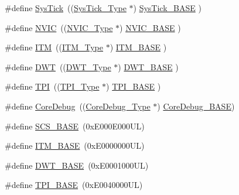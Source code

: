 \begin{DoxyCompactItemize}
\item 
\#define \hyperlink{group___c_m_s_i_s__core__base_gacd96c53beeaff8f603fcda425eb295de}{Sys\+Tick}~((\hyperlink{struct_sys_tick___type}{Sys\+Tick\+\_\+\+Type}   $\ast$)     \hyperlink{group___c_m_s_i_s__core__base_ga58effaac0b93006b756d33209e814646}{Sys\+Tick\+\_\+\+B\+A\+SE}  )
\item 
\#define \hyperlink{group___c_m_s_i_s__core__base_gac8e97e8ce56ae9f57da1363a937f8a17}{N\+V\+IC}~((\hyperlink{struct_n_v_i_c___type}{N\+V\+I\+C\+\_\+\+Type}      $\ast$)     \hyperlink{group___c_m_s_i_s__core__base_gaa0288691785a5f868238e0468b39523d}{N\+V\+I\+C\+\_\+\+B\+A\+SE}     )
\item 
\#define \hyperlink{group___c_m_s_i_s__core__base_gabae7cdf882def602cb787bb039ff6a43}{I\+TM}~((\hyperlink{struct_i_t_m___type}{I\+T\+M\+\_\+\+Type}       $\ast$)     \hyperlink{group___c_m_s_i_s__core__base_gadd76251e412a195ec0a8f47227a8359e}{I\+T\+M\+\_\+\+B\+A\+SE}      )
\item 
\#define \hyperlink{group___c_m_s_i_s__core__base_gabbe5a060185e1d5afa3f85b14e10a6ce}{D\+WT}~((\hyperlink{struct_d_w_t___type}{D\+W\+T\+\_\+\+Type}       $\ast$)     \hyperlink{group___c_m_s_i_s__core__base_gafdab534f961bf8935eb456cb7700dcd2}{D\+W\+T\+\_\+\+B\+A\+SE}      )
\item 
\#define \hyperlink{group___c_m_s_i_s__core__base_ga8b4dd00016aed25a0ea54e9a9acd1239}{T\+PI}~((\hyperlink{struct_t_p_i___type}{T\+P\+I\+\_\+\+Type}       $\ast$)     \hyperlink{group___c_m_s_i_s__core__base_ga2b1eeff850a7e418844ca847145a1a68}{T\+P\+I\+\_\+\+B\+A\+SE}      )
\item 
\#define \hyperlink{group___c_m_s_i_s__core__base_gab6e30a2b802d9021619dbb0be7f5d63d}{Core\+Debug}~((\hyperlink{struct_core_debug___type}{Core\+Debug\+\_\+\+Type} $\ast$)     \hyperlink{group___c_m_s_i_s__core__base_ga680604dbcda9e9b31a1639fcffe5230b}{Core\+Debug\+\_\+\+B\+A\+SE})
\item 
\#define \hyperlink{group___c_m_s_i_s__core__base_ga3c14ed93192c8d9143322bbf77ebf770}{S\+C\+S\+\_\+\+B\+A\+SE}~(0x\+E000\+E000\+U\+L)
\item 
\#define \hyperlink{group___c_m_s_i_s__core__base_gadd76251e412a195ec0a8f47227a8359e}{I\+T\+M\+\_\+\+B\+A\+SE}~(0x\+E0000000\+U\+L)
\item 
\#define \hyperlink{group___c_m_s_i_s__core__base_gafdab534f961bf8935eb456cb7700dcd2}{D\+W\+T\+\_\+\+B\+A\+SE}~(0x\+E0001000\+U\+L)
\item 
\#define \hyperlink{group___c_m_s_i_s__core__base_ga2b1eeff850a7e418844ca847145a1a68}{T\+P\+I\+\_\+\+B\+A\+SE}~(0x\+E0040000\+U\+L)

\end{DoxyCompactItemize}
